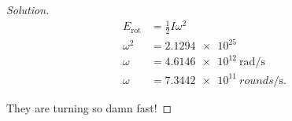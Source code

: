 \begin{enumerate}
\begin{proof}[Solution]
\begin{align*}
	E_{\text{rot}} &= \frac{1}{2} I \omega^2\\
	\omega^2 &= \SI{2.1294e+25}{}\\
	\omega &= \SI{4.6146e+12}{\radian \per \second}\\
	\omega &= \SI{7.3442e+11}{rounds \per \second}
.\end{align*}

They are turning so damn fast!
\end{proof}

\end{enumerate}

